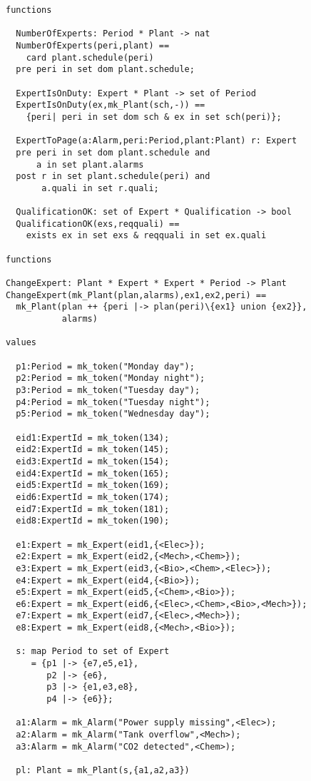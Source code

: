 \begin{lstlisting}
functions

  NumberOfExperts: Period * Plant -> nat
  NumberOfExperts(peri,plant) ==
    card plant.schedule(peri)
  pre peri in set dom plant.schedule;

  ExpertIsOnDuty: Expert * Plant -> set of Period
  ExpertIsOnDuty(ex,mk_Plant(sch,-)) ==
    {peri| peri in set dom sch & ex in set sch(peri)};

  ExpertToPage(a:Alarm,peri:Period,plant:Plant) r: Expert
  pre peri in set dom plant.schedule and
      a in set plant.alarms
  post r in set plant.schedule(peri) and
       a.quali in set r.quali;

  QualificationOK: set of Expert * Qualification -> bool
  QualificationOK(exs,reqquali) ==
    exists ex in set exs & reqquali in set ex.quali

functions

ChangeExpert: Plant * Expert * Expert * Period -> Plant
ChangeExpert(mk_Plant(plan,alarms),ex1,ex2,peri) ==
  mk_Plant(plan ++ {peri |-> plan(peri)\{ex1} union {ex2}},
           alarms)

values
 
  p1:Period = mk_token("Monday day");
  p2:Period = mk_token("Monday night");
  p3:Period = mk_token("Tuesday day");
  p4:Period = mk_token("Tuesday night");
  p5:Period = mk_token("Wednesday day");

  eid1:ExpertId = mk_token(134);
  eid2:ExpertId = mk_token(145);
  eid3:ExpertId = mk_token(154);
  eid4:ExpertId = mk_token(165);
  eid5:ExpertId = mk_token(169);
  eid6:ExpertId = mk_token(174);
  eid7:ExpertId = mk_token(181);
  eid8:ExpertId = mk_token(190);
  
  e1:Expert = mk_Expert(eid1,{<Elec>});
  e2:Expert = mk_Expert(eid2,{<Mech>,<Chem>});
  e3:Expert = mk_Expert(eid3,{<Bio>,<Chem>,<Elec>});
  e4:Expert = mk_Expert(eid4,{<Bio>});
  e5:Expert = mk_Expert(eid5,{<Chem>,<Bio>});
  e6:Expert = mk_Expert(eid6,{<Elec>,<Chem>,<Bio>,<Mech>});
  e7:Expert = mk_Expert(eid7,{<Elec>,<Mech>});
  e8:Expert = mk_Expert(eid8,{<Mech>,<Bio>});

  s: map Period to set of Expert
     = {p1 |-> {e7,e5,e1},
        p2 |-> {e6},
        p3 |-> {e1,e3,e8},
        p4 |-> {e6}};

  a1:Alarm = mk_Alarm("Power supply missing",<Elec>);
  a2:Alarm = mk_Alarm("Tank overflow",<Mech>);
  a3:Alarm = mk_Alarm("CO2 detected",<Chem>);

  pl: Plant = mk_Plant(s,{a1,a2,a3})
\end{lstlisting}  
